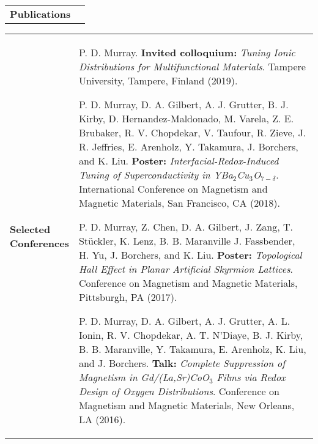 \documentclass[10pt,letterpaper]{article}
\newcommand{\coll}{1.2}
\newcommand{\colr}{8}
\begin{document}
\vspace{-0.5cm}
\begin{longtabu} to \textwidth{X[\coll] X[\colr]}
    \textbf{Publications} & \vspace{-0.55cm}\printbibliography[heading=none]    
\end{longtabu}
\vspace{-0.5cm}
\begin{longtabu} to \textwidth{X[\coll] X[\colr]}
    \textbf{Selected \newline Conferences} & P. D. Murray. \textbf{Invited colloquium:} \emph{Tuning Ionic Distributions for Multifunctional Materials}. Tampere University, Tampere, Finland (2019). \newline
    
    P. D. Murray, D. A. Gilbert, A. J. Grutter, B. J. Kirby, D. Hernandez-Maldonado, M. Varela, Z. E. Brubaker, R. V. Chopdekar, V. Taufour, R. Zieve, J. R. Jeffries, E. Arenholz, Y. Takamura, J. Borchers, and K. Liu. \textbf{Poster:} \emph{Interfacial-Redox-Induced Tuning of Superconductivity in YBa$_2$Cu$_3$O$_{7-\delta}$}. International Conference on Magnetism and Magnetic Materials, San Francisco, CA (2018). \newline

    P. D. Murray, Z. Chen, D. A. Gilbert, J. Zang, T. Stückler, K. Lenz, B. B. Maranville J. Fassbender, H. Yu, J. Borchers, and K. Liu. \textbf{Poster:} \emph{Topological Hall Effect in Planar Artificial Skyrmion Lattices}. Conference on Magnetism and Magnetic Materials, Pittsburgh, PA (2017). \newline

    P. D. Murray, D. A. Gilbert, A. J. Grutter, A. L. Ionin, R. V. Chopdekar, A. T. N’Diaye, B. J. Kirby, B. B. Maranville, Y. Takamura, E. Arenholz, K. Liu, and J. Borchers. \textbf{Talk:} \emph{Complete Suppression of Magnetism in Gd/(La,Sr)CoO$_3$ Films via Redox Design of Oxygen Distributions}. Conference on Magnetism and Magnetic Materials, New Orleans, LA (2016). \newline

\end{longtabu}
\end{document}
